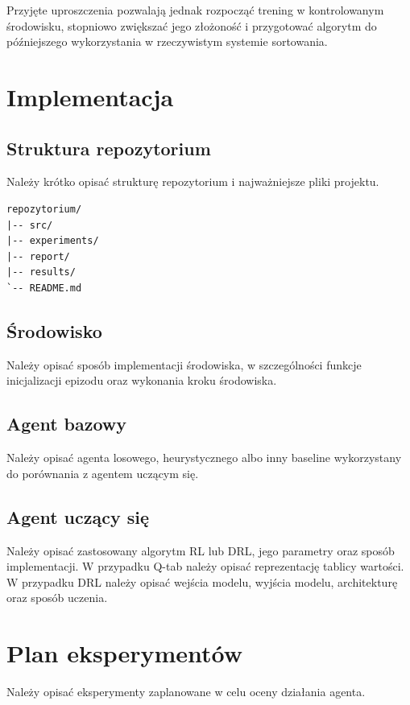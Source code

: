 \documentclass[12pt]{article}
\begin{document}
Przyjęte uproszczenia pozwalają jednak rozpocząć trening w kontrolowanym środowisku, stopniowo zwiększać jego złożoność i przygotować algorytm do późniejszego wykorzystania w rzeczywistym systemie sortowania.

\section{Implementacja}

\subsection{Struktura repozytorium}

Należy krótko opisać strukturę repozytorium i najważniejsze pliki projektu.

\begin{verbatim}
repozytorium/
|-- src/
|-- experiments/
|-- report/
|-- results/
`-- README.md
\end{verbatim}

\subsection{Środowisko}

Należy opisać sposób implementacji środowiska, w szczególności funkcje inicjalizacji epizodu oraz wykonania kroku środowiska.

\subsection{Agent bazowy}

Należy opisać agenta losowego, heurystycznego albo inny baseline wykorzystany do porównania z agentem uczącym się.

\subsection{Agent uczący się}

Należy opisać zastosowany algorytm RL lub DRL, jego parametry oraz sposób implementacji. W przypadku Q-tab należy opisać reprezentację tablicy wartości. W przypadku DRL należy opisać wejścia modelu, wyjścia modelu, architekturę oraz sposób uczenia.

\section{Plan eksperymentów}

Należy opisać eksperymenty zaplanowane w celu oceny działania agenta.
\end{document}

